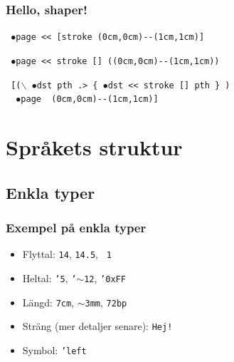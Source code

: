 \documentclass[noamsthm,handout]{beamer}
\begin{document}
\begin{frame}[fragile]
  \frametitle{Hello, shaper!}

\texttt{%
$\bullet$page <{}< [stroke (0cm,0cm)-{}-(1cm,1cm)]
}

\vspace{5mm}

\pause

\texttt{%
$\bullet$page <{}< stroke [] ((0cm,0cm)-{}-(1cm,1cm))
}

\vspace{5mm}

\pause

\texttt{%
[($\backslash$ $\bullet$dst pth .> \{ $\bullet$dst <{}< stroke [] pth \} )\\
\ \ $\bullet$page \ (0cm,0cm)-{}-(1cm,1cm)]
}

\end{frame}

\section{Språkets struktur}

\subsection{Enkla typer}
\begin{frame}[fragile]\frametitle{Exempel på enkla typer}
  \begin{itemize}
  \item Flyttal: \texttt{14}, \texttt{14.5}, \texttt{~1}
  \item Heltal: \texttt{'5}, \texttt{'$\sim$12}, \texttt{'0xFF}
  \item Längd: \texttt{7cm}, \texttt{$\sim$3mm}, \texttt{72bp}
  \item Sträng (mer detaljer senare): \texttt{\textasciigrave{}Hej!\textasciiacute{}}
  \item Symbol: \texttt{'left}
  \end{itemize}
\end{frame}
\end{document}
